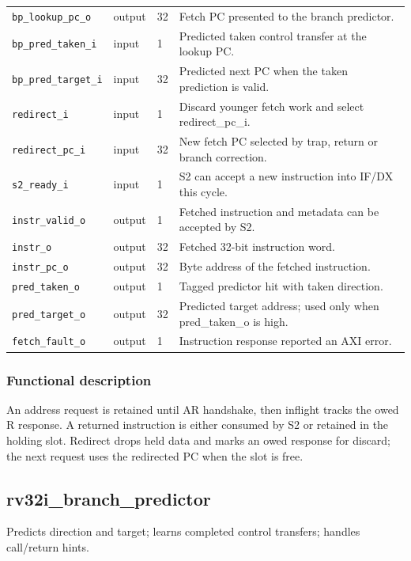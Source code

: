\documentclass[11pt]{article}
\begin{document}
{\begin{longtable}{@{}L{0.3400\dimexpr\linewidth-36pt\relax}L{0.1000\dimexpr\linewidth-36pt\relax}L{0.1000\dimexpr\linewidth-36pt\relax}L{0.4600\dimexpr\linewidth-36pt\relax}@{}}
\texttt{bp\_lookup\_pc\_o} & output & 32 & Fetch PC presented to the branch predictor. \\ \addlinespace[3pt]
\texttt{bp\_pred\_taken\_i} & input & 1 & Predicted taken control transfer at the lookup PC. \\ \addlinespace[3pt]
\texttt{bp\_pred\_target\_i} & input & 32 & Predicted next PC when the taken prediction is valid. \\ \addlinespace[3pt]
\texttt{redirect\_i} & input & 1 & Discard younger fetch work and select redirect\_pc\_i. \\ \addlinespace[3pt]
\texttt{redirect\_pc\_i} & input & 32 & New fetch PC selected by trap, return or branch correction. \\ \addlinespace[3pt]
\texttt{s2\_ready\_i} & input & 1 & S2 can accept a new instruction into IF/DX this cycle. \\ \addlinespace[3pt]
\texttt{instr\_valid\_o} & output & 1 & Fetched instruction and metadata can be accepted by S2. \\ \addlinespace[3pt]
\texttt{instr\_o} & output & 32 & Fetched 32-bit instruction word. \\ \addlinespace[3pt]
\texttt{instr\_pc\_o} & output & 32 & Byte address of the fetched instruction. \\ \addlinespace[3pt]
\texttt{pred\_taken\_o} & output & 1 & Tagged predictor hit with taken direction. \\ \addlinespace[3pt]
\texttt{pred\_target\_o} & output & 32 & Predicted target address; used only when pred\_taken\_o is high. \\ \addlinespace[3pt]
\texttt{fetch\_fault\_o} & output & 1 & Instruction response reported an AXI error. \\*
\bottomrule\end{longtable}}
\subsubsection{Functional description}
\noindent An address request is retained until AR handshake, then inflight tracks the owed R response. A returned instruction is either consumed by S2 or retained in the holding slot. Redirect drops held data and marks an owed response for discard; the next request uses the redirected PC when the slot is free.\par\medskip

\subsection{rv32i\_branch\_predictor}
Predicts direction and target; learns completed control transfers; handles call/return hints.
\end{document}

